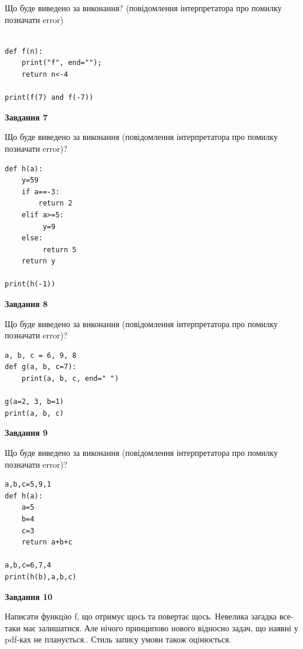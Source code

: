 \documentclass[12pt, ukrainian]{article}
\begin{document}
{\begin {large}
Що буде виведено за виконання? (повідомлення інтерпретатора про помилку позначати error)\par
\begin{verbatim}

def f(n):
    print("f", end="");
    return n<-4

print(f(7) and f(-7))
\end{verbatim}

{\begin {center}\textbf{Завдання 7}\end {center}}

Що буде виведено за виконання (повідомлення інтерпретатора про помилку позначати error)?\par
\begin{verbatim}
def h(a):
    y=59
    if a==-3: 
        return 2
    elif a>=5:
         y=9
    else:
         return 5
    return y

print(h(-1))
\end{verbatim}

{\begin {center}\textbf{Завдання 8}\end {center}}

Що буде виведено за виконання (повідомлення інтерпретатора про помилку позначати error)?\par
\begin{verbatim}
a, b, c = 6, 9, 8
def g(a, b, c=7):
    print(a, b, c, end=" ")

g(a=2, 3, b=1)
print(a, b, c)
\end{verbatim}

{\begin {center}\textbf{Завдання 9}\end {center}}

Що буде виведено за виконання (повідомлення інтерпретатора про помилку позначати error)?\par
\begin{verbatim}
a,b,c=5,9,1
def h(a):
    a=5
    b=4
    c=3
    return a+b+c

a,b,c=6,7,4
print(h(b),a,b,c)
\end{verbatim}

{\begin {center}\textbf{Завдання 10}\end {center}}


Написати функцiю f, що отримує щось та повертає щось. Невелика загадка все-таки має залишатися. Але нічого принципово нового відносно задач, що наявні у pdf-ках не планується.. Стиль запису умови також оцінюється.\par
\end {large}}
\newpage
\end{document}
